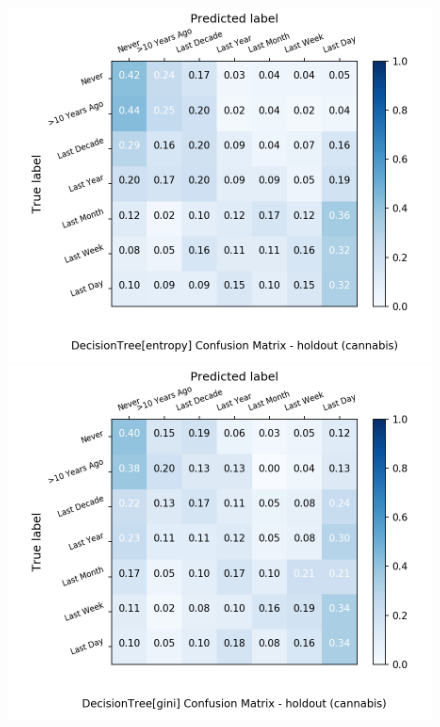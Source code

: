 \begin{figure}[H]
	\centering
	\begin{minipage}[b]{0.32\textwidth}
		\includegraphics[width=1.1\textwidth]{Plots/drugs/cannabis_DecisionTree_entropy_balance_False_holdout.png}
	\end{minipage}
	\begin{minipage}[b]{0.32\textwidth}
		\includegraphics[width=1.1\textwidth]{Plots/drugs/cannabis_DecisionTree_gini_balance_False_holdout.png}
	\end{minipage}

\end{figure}

